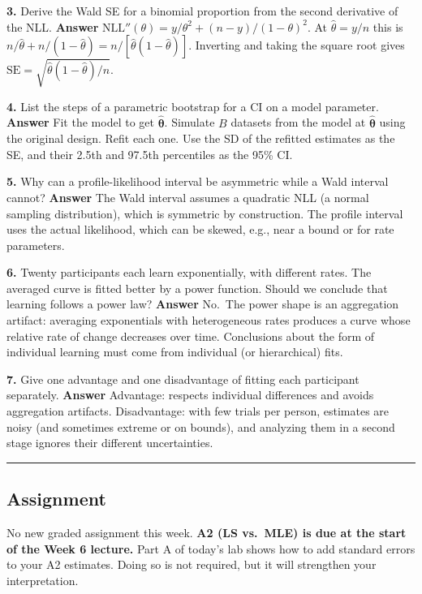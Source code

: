 \textbf{3.} Derive the Wald SE for a binomial proportion from the second
derivative of the NLL. \textbf{Answer}
\(\mathrm{NLL}''(\theta) = y/\theta^2 + (n-y)/(1-\theta)^2\). At
\(\hat\theta = y/n\) this is
\(n/\hat\theta + n/(1-\hat\theta) = n/[\hat\theta(1-\hat\theta)]\).
Inverting and taking the square root gives
\(\mathrm{SE} = \sqrt{\hat\theta(1-\hat\theta)/n}\).

\textbf{4.} List the steps of a parametric bootstrap for a CI on a model
parameter. \textbf{Answer} Fit the model to get
\(\hat{\boldsymbol\theta}\). Simulate \(B\) datasets from the model at
\(\hat{\boldsymbol\theta}\) using the original design. Refit each one.
Use the SD of the refitted estimates as the SE, and their 2.5th and
97.5th percentiles as the 95\% CI.

\textbf{5.} Why can a profile-likelihood interval be asymmetric while a
Wald interval cannot? \textbf{Answer} The Wald interval assumes a
quadratic NLL (a normal sampling distribution), which is symmetric by
construction. The profile interval uses the actual likelihood, which can
be skewed, e.g., near a bound or for rate parameters.

\textbf{6.} Twenty participants each learn exponentially, with different
rates. The averaged curve is fitted better by a power function. Should
we conclude that learning follows a power law? \textbf{Answer} No.~The
power shape is an aggregation artifact: averaging exponentials with
heterogeneous rates produces a curve whose relative rate of change
decreases over time. Conclusions about the form of individual learning
must come from individual (or hierarchical) fits.

\textbf{7.} Give one advantage and one disadvantage of fitting each
participant separately. \textbf{Answer} Advantage: respects individual
differences and avoids aggregation artifacts. Disadvantage: with few
trials per person, estimates are noisy (and sometimes extreme or on
bounds), and analyzing them in a second stage ignores their different
uncertainties.

\begin{center}\rule{0.5\linewidth}{0.5pt}\end{center}

\subsection{Assignment}

No new graded assignment this week. \textbf{A2 (LS vs.~MLE) is due at
the start of the Week 6 lecture.} Part A of today's lab shows how to add
standard errors to your A2 estimates. Doing so is not required, but it
will strengthen your interpretation.

